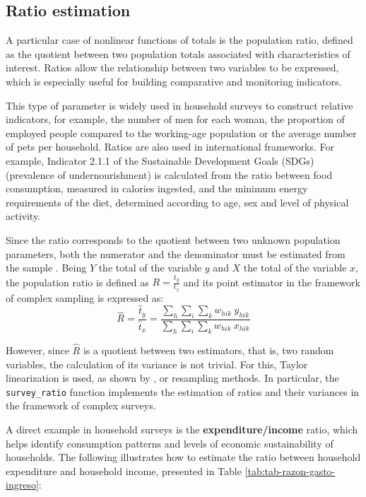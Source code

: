 \documentclass[
  english,
  12pt,
]{book}
\begin{document}
\subsection{Ratio estimation}\label{estimacion-de-razones}

A particular case of nonlinear functions of totals is the population ratio, defined as the quotient between two population totals associated with characteristics of interest. Ratios allow the relationship between two variables to be expressed, which is especially useful for building comparative and monitoring indicators.

This type of parameter is widely used in household surveys to construct relative indicators, for example, the number of men for each woman, the proportion of employed people compared to the working-age population or the average number of pets per household. Ratios are also used in international frameworks. For example, Indicator 2.1.1 of the Sustainable Development Goals (SDGs) (prevalence of undernourishment) is calculated from the ratio between food consumption, measured in calories ingested, and the minimum energy requirements of the diet, determined according to age, sex and level of physical activity.

Since the ratio corresponds to the quotient between two unknown population parameters, both the numerator and the denominator must be estimated from the sample \citep{bautista1998}. Being \(Y\) the total of the variable \(y\) and \(X\) the total of the variable \(x\), the population ratio is defined as \(R = \frac{t_y}{t_x}\) and its point estimator in the framework of complex sampling is expressed as:
\[
\hat{R} = \frac{\hat{t}_y}{\hat{t}_x}
= \frac{\sum_{h}\sum_{i}\sum_{k} w_{hik} \ y_{hik}}
       {\sum_{h}\sum_{i}\sum_{k} w_{hik} \ x_{hik}}
\]

However, since \(\hat{R}\) is a quotient between two estimators, that is, two random variables, the calculation of its variance is not trivial. For this, Taylor linearization is used, as shown by \citet{Gutierrez2016}, or resampling methods. In particular, the \texttt{survey\_ratio} function implements the estimation of ratios and their variances in the framework of complex surveys.

A direct example in household surveys is the \textbf{expenditure/income} ratio, which helps identify consumption patterns and levels of economic sustainability of households. The following illustrates how to estimate the ratio between household expenditure and household income, presented in Table \ref{tab:tab-razon-gasto-ingreso}:
\end{document}
